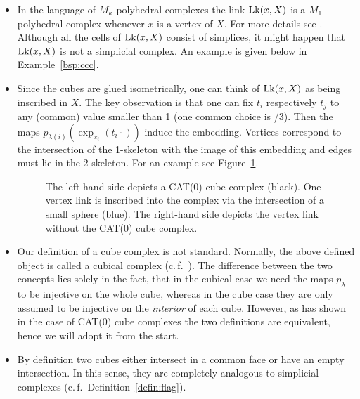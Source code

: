 \begin{rem}
  \label{rem:complex}
  \begin{itemize}
  \item In the language of \(M_\kappa\)-polyhedral complexes the link \(\operatorname{Lk}(x, X)\) is a \(M_1\)-polyhedral complex whenever \(x\) is a vertex of \(X\). For more details see \textcite[Section~I.7]{MR1744486}. Although all the cells of \(\operatorname{Lk}(x,X)\) consist of simplices, it might happen that \(\operatorname{Lk}(x,X)\) is not a simplicial complex. An example is given below in Example~\ref{bsp:ccc}. 
  \item Since the cubes are glued isometrically, one can think of \(\operatorname{Lk}(x,X)\) as being inscribed in \(X\). The key observation is that one can fix \(t_i\) respectively \(t_j\) to any (common) value smaller than 1 (one common choice is {/3}). Then the maps \(p_{\lambda(i)}(\exp_{x_i}(t_i \cdot))\) induce the embedding. Vertices correspond to the intersection of the 1-skeleton with the image of this embedding and edges must lie in the 2-skeleton. For an example see Figure~\ref{fig:link}.
    \begin{figure}[htbp]
      \centering
      
      \caption{The left-hand side depicts a CAT(0) cube complex (black). One vertex link is inscribed into the complex via the intersection of a small sphere (blue). The right-hand side depicts the vertex link without the CAT(0) cube complex.}
      \label{fig:link}
    \end{figure}
  \item Our definition of a cube complex is not standard. Normally, the above defined object is called a cubical complex (c.\,f.~\cite[Def.~I.7.37]{MR1744486}). The difference between the two concepts lies solely in the fact, that in the cubical case we need the maps \(p_\lambda\) to be injective on the whole cube, whereas in the cube case they are only assumed to be injective on the \emph{interior} of each cube. However, as \textcite[Thm.~C.4]{MR3029427} has shown in the case of CAT(0) cube complexes the two definitions are equivalent, hence we will adopt it from the start.
  \item By definition two cubes either intersect in a common face or have an empty intersection. In this sense, they are completely analogous to simplicial complexes (c.\,f.\ Definition~\ref{defin:flag}). 
  \end{itemize}
\end{rem}


